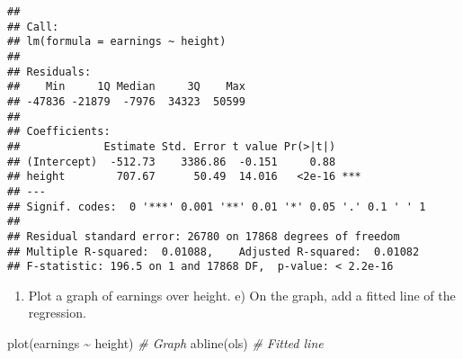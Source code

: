 \documentclass[
]{article}
\newenvironment{Shaded}{\begin{snugshade}}{\end{snugshade}}
\newcommand{\CommentTok}[1]{\textcolor[rgb]{0.56,0.35,0.01}{\textit{#1}}}
\newcommand{\FunctionTok}[1]{\textcolor[rgb]{0.00,0.00,0.00}{#1}}
\newcommand{\NormalTok}[1]{#1}
\newcommand{\SpecialCharTok}[1]{\textcolor[rgb]{0.00,0.00,0.00}{#1}}
\providecommand{\tightlist}{%
  \setlength{\itemsep}{0pt}\setlength{\parskip}{0pt}}
\begin{document}
\begin{verbatim}
## 
## Call:
## lm(formula = earnings ~ height)
## 
## Residuals:
##    Min     1Q Median     3Q    Max 
## -47836 -21879  -7976  34323  50599 
## 
## Coefficients:
##             Estimate Std. Error t value Pr(>|t|)    
## (Intercept)  -512.73    3386.86  -0.151     0.88    
## height        707.67      50.49  14.016   <2e-16 ***
## ---
## Signif. codes:  0 '***' 0.001 '**' 0.01 '*' 0.05 '.' 0.1 ' ' 1
## 
## Residual standard error: 26780 on 17868 degrees of freedom
## Multiple R-squared:  0.01088,    Adjusted R-squared:  0.01082 
## F-statistic: 196.5 on 1 and 17868 DF,  p-value: < 2.2e-16
\end{verbatim}

\begin{Shaded}
\end{Shaded}

\begin{enumerate}
\def\labelenumi{\alph{enumi})}
\setcounter{enumi}{3}
\tightlist
\item
  Plot a graph of earnings over height. e) On the graph, add a fitted
  line of the regression.
\end{enumerate}

\begin{Shaded}
\begin{Highlighting}[]
\FunctionTok{plot}\NormalTok{(earnings }\SpecialCharTok{\textasciitilde{}}\NormalTok{ height)     }\CommentTok{\# Graph}
\FunctionTok{abline}\NormalTok{(ols)                 }\CommentTok{\# Fitted line}
\end{Highlighting}
\end{Shaded}
\end{document}
